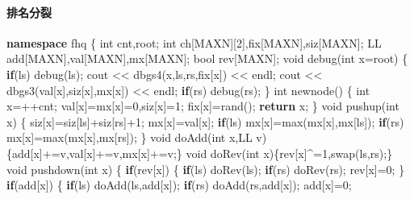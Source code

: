 \documentclass[
]{article}
\newenvironment{Shaded}{}{}
\newcommand{\ControlFlowTok}[1]{\textcolor[rgb]{0.00,0.44,0.13}{\textbf{#1}}}
\newcommand{\DataTypeTok}[1]{\textcolor[rgb]{0.56,0.13,0.00}{#1}}
\newcommand{\DecValTok}[1]{\textcolor[rgb]{0.25,0.63,0.44}{#1}}
\newcommand{\KeywordTok}[1]{\textcolor[rgb]{0.00,0.44,0.13}{\textbf{#1}}}
\newcommand{\NormalTok}[1]{#1}
\begin{document}
\hypertarget{ux6392ux540dux5206ux88c2}{%
\paragraph{排名分裂}\label{ux6392ux540dux5206ux88c2}}

\begin{Shaded}
\begin{Highlighting}[]
\KeywordTok{namespace}\NormalTok{ fhq}
\NormalTok{\{}
    \DataTypeTok{int}\NormalTok{ cnt,root;}
    \DataTypeTok{int}\NormalTok{ ch[MAXN][}\DecValTok{2}\NormalTok{],fix[MAXN],siz[MAXN];}
\NormalTok{    LL add[MAXN],val[MAXN],mx[MAXN];}
    \DataTypeTok{bool}\NormalTok{ rev[MAXN];}
    \DataTypeTok{void}\NormalTok{ debug(}\DataTypeTok{int}\NormalTok{ x=root)}
\NormalTok{    \{}
        \ControlFlowTok{if}\NormalTok{(ls) debug(ls);}
\NormalTok{        cout \textless{}\textless{} dbgs4(x,ls,rs,fix[x]) \textless{}\textless{} endl;}
\NormalTok{        cout \textless{}\textless{} dbgs3(val[x],siz[x],mx[x]) \textless{}\textless{} endl;}
        \ControlFlowTok{if}\NormalTok{(rs) debug(rs);}
\NormalTok{    \}}
    \DataTypeTok{int}\NormalTok{ newnode()}
\NormalTok{    \{}
        \DataTypeTok{int}\NormalTok{ x=++cnt;}
\NormalTok{        val[x]=mx[x]=}\DecValTok{0}\NormalTok{,siz[x]=}\DecValTok{1}\NormalTok{;}
\NormalTok{        fix[x]=rand();}
        \ControlFlowTok{return}\NormalTok{ x;}
\NormalTok{    \}}
    \DataTypeTok{void}\NormalTok{ pushup(}\DataTypeTok{int}\NormalTok{ x)}
\NormalTok{    \{}
\NormalTok{        siz[x]=siz[ls]+siz[rs]+}\DecValTok{1}\NormalTok{;}
\NormalTok{        mx[x]=val[x];}
        \ControlFlowTok{if}\NormalTok{(ls) mx[x]=max(mx[x],mx[ls]);}
        \ControlFlowTok{if}\NormalTok{(rs) mx[x]=max(mx[x],mx[rs]);}
\NormalTok{    \}}
    \DataTypeTok{void}\NormalTok{ doAdd(}\DataTypeTok{int}\NormalTok{ x,LL v)\{add[x]+=v,val[x]+=v,mx[x]+=v;\}}
    \DataTypeTok{void}\NormalTok{ doRev(}\DataTypeTok{int}\NormalTok{ x)\{rev[x]\^{}=}\DecValTok{1}\NormalTok{,swap(ls,rs);\}}
    \DataTypeTok{void}\NormalTok{ pushdown(}\DataTypeTok{int}\NormalTok{ x)}
\NormalTok{    \{}
        \ControlFlowTok{if}\NormalTok{(rev[x])}
\NormalTok{        \{}
            \ControlFlowTok{if}\NormalTok{(ls) doRev(ls);}
            \ControlFlowTok{if}\NormalTok{(rs) doRev(rs);}
\NormalTok{            rev[x]=}\DecValTok{0}\NormalTok{;}
\NormalTok{        \}}
        \ControlFlowTok{if}\NormalTok{(add[x])}
\NormalTok{        \{}
            \ControlFlowTok{if}\NormalTok{(ls) doAdd(ls,add[x]);}
            \ControlFlowTok{if}\NormalTok{(rs) doAdd(rs,add[x]);}
\NormalTok{            add[x]=}\DecValTok{0}\NormalTok{;}

\end{Highlighting}
\end{Shaded}
\end{document}
